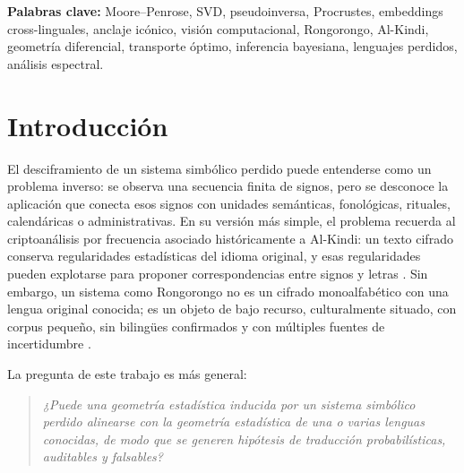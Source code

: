 \documentclass[11pt,a4paper]{article}
\newcommand{\1}{\mathbf{1}}
\numberwithin{equation}{section}
\begin{document}
\begin{abstract}
La versión implementada incorpora una primera tubería real de anclaje icónico: 5\,374 instancias SVG reales del RR-corpus, 448 clases base Barthel, 17 referentes de Rapa Nui con imágenes reales y una validación cross-script sobre 14 signos descifrados/estandarizados. El resultado es deliberadamente conservador: aunque la corrida Rongorongo obtiene $\mathrm{AnchorPower}=0.970$ y estabilidad bootstrap $0.820$, la validación cross-script alcanza solo Acc@5 $=0.286$, por debajo del umbral $0.6$ requerido para $C_{2.5}$. Por tanto, \textbf{ningún claim iconográfico $C_{2.5}$ queda admitido todavía}. Esto ilustra el principio rector del trabajo: generar candidatos auditables sin convertirlos prematuramente en significado.
\end{abstract}

\noindent\textbf{Palabras clave:} Moore--Penrose, SVD, pseudoinversa, Procrustes, embeddings cross-linguales, anclaje icónico, visión computacional, Rongorongo, Al-Kindi, geometría diferencial, transporte óptimo, inferencia bayesiana, lenguajes perdidos, análisis espectral.

\tableofcontents
\newpage

\section{Introducción}

El desciframiento de un sistema simbólico perdido puede entenderse como un problema inverso: se observa una secuencia finita de signos, pero se desconoce la aplicación que conecta esos signos con unidades semánticas, fonológicas, rituales, calendáricas o administrativas. En su versión más simple, el problema recuerda al criptoanálisis por frecuencia asociado históricamente a Al-Kindi: un texto cifrado conserva regularidades estadísticas del idioma original, y esas regularidades pueden explotarse para proponer correspondencias entre signos y letras \cite{broemeling2011alkindi}. Sin embargo, un sistema como Rongorongo no es un cifrado monoalfabético con una lengua original conocida; es un objeto de bajo recurso, culturalmente situado, con corpus pequeño, sin bilingües confirmados y con múltiples fuentes de incertidumbre \cite{ferrara2024rongorongo}.

La pregunta de este trabajo es más general:

\begin{quote}
    \emph{¿Puede una geometría estadística inducida por un sistema simbólico perdido alinearse con la geometría estadística de una o varias lenguas conocidas, de modo que se generen hipótesis de traducción probabilísticas, auditables y falsables?}
\end{quote}
\end{document}
